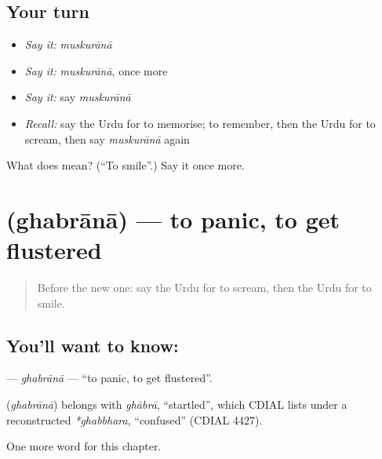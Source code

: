 \subsection*{Your turn}
\begin{itemize}
\raggedright
  \item \emph{Say it:} \emph{muskurānā}
  \item \emph{Say it:} \emph{muskurānā}, once more
  \item \emph{Say it:} say \emph{muskurānā}
  \item \emph{Recall:} say the Urdu for to memorise; to remember, then the Urdu for to scream, then say \emph{muskurānā} again
\end{itemize}

\begin{tcolorbox}[breakable,colback=teal!4,colframe=teal!35!black,title={Before you move on}]
What does  mean? (\textquotedblleft{}To smile\textquotedblright{}.) Say it once more.
\end{tcolorbox}
\section[\texorpdfstring{\ur{گھبرانا} (ghabrānā)}{گھبرانا (ghabrānā)}]{ (ghabrānā) — to panic, to get flustered}

\label{lesson:UR-C147-ghabrana}



\begin{quote}
Before the new one: say the Urdu for to scream, then the Urdu for to smile.
\end{quote}

\subsection*{You'll want to know: }
\textbf{} — \emph{ghabrānā} — \textquotedblleft{}to panic, to get flustered\textquotedblright{}.

\begin{cousinweb}
\textbf{} (\emph{ghabrānā}) belongs with \emph{ghābrā}, \textquotedblleft{}startled\textquotedblright{}, which CDIAL lists under a reconstructed \emph{*ghabbhara}, \textquotedblleft{}confused\textquotedblright{} (CDIAL 4427).
\end{cousinweb}

\begin{grammarlens}[title={What you've built}]
One more word for this chapter.
\end{grammarlens}

